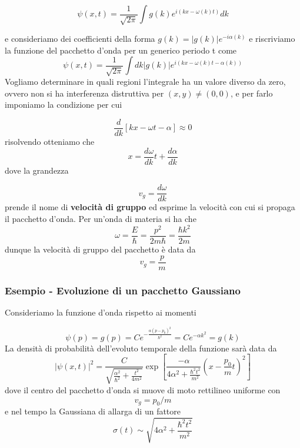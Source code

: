\begin{equation*}
	\psi(x,t) = \frac{1}{\sqrt{2\pi}} \int g(k) e^{i(kx-\omega(k)t)}dk
\end{equation*}

e consideriamo dei coefficienti della forma $g(k) = |g(k)|e^{-i \alpha(k)} $ e riscriviamo la funzione del pacchetto d'onda per un generico periodo t come 
\begin{equation*}
	\psi(x,t) = \frac{1}{\sqrt{2\pi}} \int dk|g(k)|e^{i(kx - \omega(k)t - \alpha(k))} 
\end{equation*}
Vogliamo determinare in quali regioni l'integrale ha un valore diverso da zero, ovvero non si ha interferenza distruttiva per $(x,y) \neq (0,0)$, e per farlo imponiamo la condizione per cui 

\begin{equation}
	\frac{d}{dk} \left [ kx - \omega t - \alpha \right] \approx  0
\end{equation}
risolvendo otteniamo che 
\begin{equation}
	x = \frac{d \omega}{dk}t + \frac{d\alpha}{dk}
\end{equation}
dove la grandezza
 
\begin{equation*}
	v_g = \frac{d \omega}{dk} 
\end{equation*}
prende il nome di \textbf{velocit\`a di gruppo} ed esprime la velocit\`a con cui si propaga il pacchetto d'onda.
Per un'onda di materia si ha che 
\begin{equation*}
	\omega  = \frac{E}{\hbar} = \frac{p^2}{2m \hbar } = \frac{\hbar k^2}{2m }
\end{equation*}
dunque la velocit\`a di gruppo del pacchetto \`e data da 
\begin{equation*}
	v_g = \frac{p}{m}
\end{equation*}

\subsubsection{Esempio - Evoluzione di un pacchetto Gaussiano}

Consideriamo la funzione d'onda rispetto ai momenti 

\begin{equation*}
	\psi(p) = g(p) = C e^{-\frac{\alpha(p-p_0)^2}{\hbar^2}} = Ce^{- \alpha k^2} = g(k)
\end{equation*}
La densit\`a di probabilit\`a dell'evoluto temporale della funzione sar\`a data da 
\begin{equation*}
|\psi(x,t)|^2 = \frac{C}{\sqrt{\frac{\alpha^2}{\hbar^2} + \frac{t^2}{4m^2}}} \exp{\left [ \frac{-\alpha}{4 \alpha^2 + \frac{\hbar^2 t^2}{m^2}}\left ( x - \frac{p_0}{m}t\right)^2\right]}
\end{equation*}
dove il centro del pacchetto d'onda si muove di moto rettilineo uniforme con
\begin{equation*}
	v_g = p_0/m
\end{equation*}
 e nel tempo la Gaussiana di allarga di un fattore 
 \begin{equation*}
 	\sigma(t) \sim \sqrt{4 \alpha^2 + \frac{\hbar^2 t^2}{m^2}}
 \end{equation*}
 

